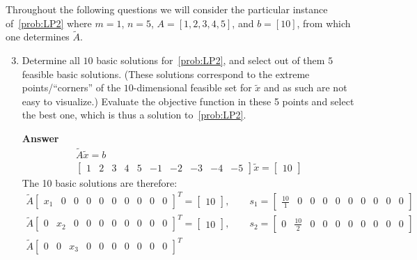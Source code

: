 \documentclass[10pt,a4paper]{article}
\theoremstyle{plain}
\theoremstyle{definition}
\begin{document}
Throughout the following questions we will consider the particular instance of~\eqref{prob:LP2} where \(m=1\), \(n=5\), \(A=[1,2,3,4,5]\), and \(b = [10]\), from which one determines \(\tilde{A}\).
\begin{enumerate}
  \setcounter{enumi}{2}
  \item\label{spm:basic}
  Determine all \(10\) basic solutions for~\eqref{prob:LP2}, and select out of them \(5\) feasible basic solutions.
  (These solutions correspond to the extreme points/``corners'' of the \(10\)-dimensional feasible set for \(\tilde{x}\) and as such are not easy to visualize.) Evaluate the objective function in these 5 points and select the best one, which is thus a solution to~\eqref{prob:LP2}.
  \item[\textbf{Answer}] 
  \begin{align*}
    \tilde{A}\tilde{x}=b \\
    \begin{bmatrix}
      1 & 2 & 3 & 4 & 5 & -1 & -2 & -3 & -4 & -5
    \end{bmatrix}
    \tilde{x}=\begin{bmatrix}
      10
    \end{bmatrix}
  \end{align*}
  The 10 basic solutions are therefore:
  \begin{align*}
    \tilde{A}
  		\begin{bmatrix}
  			x_1 & 0 & 0 & 0 & 0 & 0 & 0 & 0 & 0 & 0
  		\end{bmatrix}^T
  		=
  		\begin{bmatrix}10\end{bmatrix},\qquad s_1=\begin{bmatrix}
  			\frac{10}{1} & 0 & 0 & 0 & 0 & 0 & 0 & 0 & 0 & 0
  		\end{bmatrix} \\
  		\tilde{A}
  		\begin{bmatrix}
  			0 & x_2 & 0 & 0 & 0 & 0 & 0 & 0 & 0 & 0
  		\end{bmatrix}^T
  		=
  		\begin{bmatrix}10\end{bmatrix},\qquad s_2=\begin{bmatrix}
  			0 & \frac{10}{2} & 0 & 0 & 0 & 0 & 0 & 0 & 0 & 0
  		\end{bmatrix} \\
  		\tilde{A}
  		\begin{bmatrix}
  			0 & 0 & x_3 & 0 & 0 & 0 & 0 & 0 & 0 & 0
  		\end{bmatrix}^T

\end{align*}
\end{enumerate}
\end{document}
